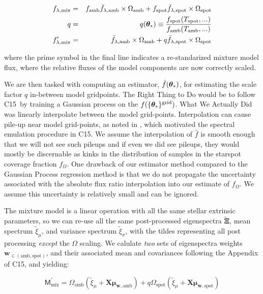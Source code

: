 \documentclass[twocolumn]{emulateapj}%
\newcommand{\iancze}{{\sc C15}}
\begin{document}
\begin{eqnarray} \label{eqn:norm_scaling}
f_{\lambda, \mathrm{mix}} &=& f_{\mathrm{amb}} \bar f_{\lambda, \mathrm{amb}} \times \Omega_{\mathrm{amb}} + f_{\mathrm{spot}} \bar f_{\lambda, \mathrm{spot}} \times \Omega_{\mathrm{spot}} \\
q &=& q({\bm \theta}_{\ast})\equiv \frac{f_{\mathrm{spot}}(T_\textrm{spot}, ...)}{f_{\mathrm{amb}}(T_\textrm{amb}, ...)} \\
f_{\lambda, \mathrm{mix}}^{\prime} &=& \bar f_{\lambda, \mathrm{amb}} \times \Omega_{\mathrm{amb}} + q \bar f_{\lambda, \mathrm{spot}} \times \Omega_{\mathrm{spot}}
\end{eqnarray}

where the prime symbol in the final line indicates a re-standarized mixture model flux, where the relative fluxes of the model components are now correctly scaled.

We are then tasked with computing an estimator, $\hat f({\bm \theta}_{\ast})$, for estimating the scale factor $q$ in-between model gridpoints.  The Right Thing to Do would be to follow \iancze\ by training a Gaussian process on the $f(\{{\bm \theta}_{\ast}\}^\textrm{grid})$.  What We Actually Did was linearly interpolate between the model grid-points.  Interpolation can cause pile-up near model grid-points, as noted in \citet{cottaar14}, which motivated the spectral emulation procedure in \iancze.  We assume the interpolation of $\hat f$ is smooth enough that we will not see such pileups and if even we did see pileups, they would mostly be discernable as kinks in the distribution of samples in the starspot coverage fraction $f_{\Omega}$.  One drawback of our estimator method compared to the Gaussian Process regression method is that we do not propagate the uncertainty associated with the absolute flux ratio interpolation into our estimate of $f_{\Omega}$.  We assume this uncertainty is relatively small and can be ignored.

The mixture model is a linear operation with all the same stellar extrinsic parameters, so we can re-use all the same post-processed eigenspectra $\widetilde{\mathbf{\Xi}}$, mean spectrum $\widetilde{\xi}_\mu$, and variance spectrum $\widetilde{\xi}_\sigma$, with the tildes representing all post processing \emph{except} the $\Omega$ scaling.  We calulate \emph{two} sets of eigenspectra weights $\mathbf{w}_{\in (\mathrm{amb}, \mathrm{spot})}$, and their associated mean and covariances following the Appendix of \iancze, and yielding:

\begin{equation}
  \mathsf{M}_{\mathrm{mix}}^\prime = \Omega_{\mathrm{amb}} (\widetilde{\xi}_\mu + \mathbf{X} \mathbf{\mu}_{\mathbf{w}, \mathrm{amb}}) + q \Omega_{\mathrm{spot}} (\widetilde{\xi}_\mu + \mathbf{X} \mathbf{\mu}_{\mathbf{w}, \mathrm{spot}})
\end{equation}
\end{document}
